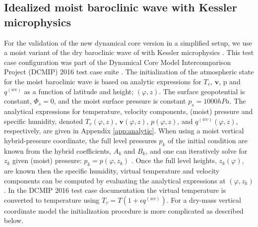 \documentclass{agujournal}
\begin{document}
{\subsection{Idealized moist baroclinic wave with Kessler microphysics}
For the validation of the new dynamical core version in a simplified setup, we use a moist variant of the dry baroclinic wave of \citet{UMJS2014QJRMS} with Kessler microphysics \citep{K1969MM}. This test case configuration was part of the Dynamical Core Model Intercomparison Project (DCMIP) 2016 test case suite \citep[][]{DCMIP16}. The initialization of the atmospheric state for the moist baroclinic wave is based on analytic expressions for $T_v$, $\mathbf{v}$, p and $q^{(wv)}$ as a function of latitude and height; $(\varphi,z)$. The surface geopotential is constant, $\Phi_s=0$, and the moist surface pressure is constant $p_s=1000hPa$. The analytical expressions for temperature, velocity components, (moist) pressure and specific humidity, denoted ${T_v}(\varphi,z)$, ${\mathbf{v}}(\varphi,z)$, ${p}(\varphi,z)$, and $q^{(wv)}(\varphi,z)$, respectively, are given in Appendix \ref{app:analytic}. When using a moist vertical hybrid-pressure coordinate, the full level pressures $p_k$ of the initial condition are known from the hybrid coefficients, $A_k$ and $B_k$, and one can iteratively solve for $z_k$ given (moist) pressure: $p_k={p}(\varphi,z_k)$ \citep[see, ][]{UMJS2014QJRMS}. Once the full level heights, $z_k(\varphi)$, are known then the specific humidity, virtual temperature and velocity components can be computed by evaluating the analytical expressions at $(\varphi,z_k)$. In the DCMIP 2016 test case documentation the virtual temperature is converted to temperature using $T_v=T\left( 1+\epsilon q^{(wv)}\right)$. For a dry-mass vertical coordinate model the initialization procedure is more complicated as described below.

}
\end{document}
